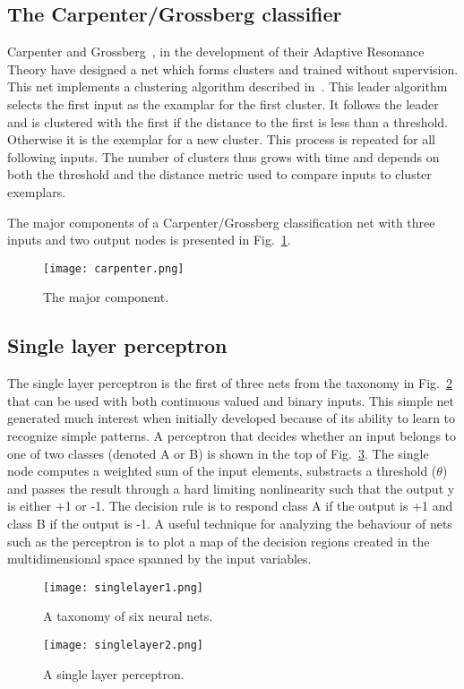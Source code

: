 \documentclass[10pt,twocolumn,letterpaper]{article}
\begin{document}
\subsection{The Carpenter/Grossberg classifier}
\par Carpenter and Grossberg~\cite{carpenter1987neural}, in the development of their Adaptive Resonance Theory have designed a net which forms clusters and trained without supervision. This net implements a clustering algorithm described in~\cite{Hartigan1975Clustering}. This leader algorithm selects the first input as the examplar for the first cluster. It follows the leader and is clustered with the first if the distance to the first is less than a threshold. Otherwise it is the exemplar for a new cluster. This process is repeated for all following inputs. The number of clusters thus grows with time and depends on both the threshold and the distance metric used to compare inputs to cluster exemplars.
\par The major components of a Carpenter/Grossberg classification net with three inputs and two output nodes is presented in Fig.~\ref{carp}.
\begin{figure}[htbp]
 \centering{}
\texttt{[image: carpenter.png]}\\
 \caption{The major component.}
\label{carp}
\end{figure}
\subsection{Single layer perceptron}
\par The single layer perceptron is the first of three nets from the taxonomy in Fig.~\ref{single1} that can be used with both continuous valued and binary inputs. This simple net generated much interest when initially developed because of its ability to learn to recognize simple patterns. A perceptron that decides whether an input belongs to one of two classes (denoted A or B) is shown in the top of Fig.~\ref{single2}. The single node computes a weighted sum of the input elements, substracts a threshold ($\theta$) and passes the result through a hard limiting nonlinearity such that the output y is either +1 or -1. The decision rule is to respond class A if the output is +1 and class B if the output is -1. A useful technique for analyzing the behaviour of nets such as the perceptron is to plot a map of the decision regions created in the multidimensional space spanned by the input variables.
\begin{figure}[htbp]
 \centering{}
\texttt{[image: singlelayer1.png]}\\
 \caption{A taxonomy of six neural nets.}
\label{single1}
\end{figure}
\begin{figure}[htbp]
 \centering{}
\texttt{[image: singlelayer2.png]}\\
 \caption{A single layer perceptron.}
\label{single2}
\end{figure}
 
 
\end{document}
